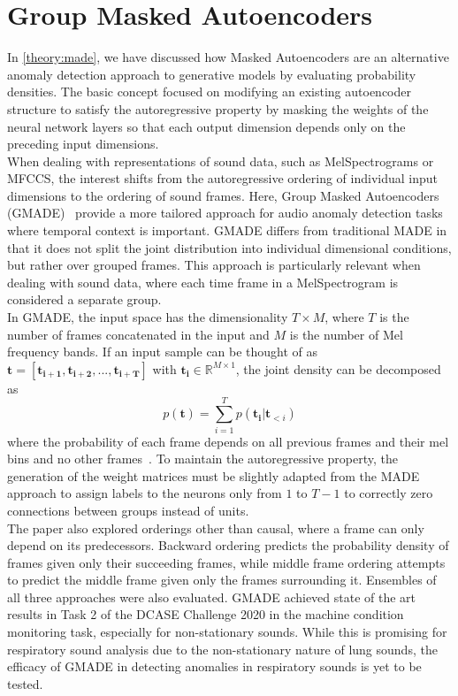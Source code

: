 \section{Group Masked Autoencoders}
In \autoref{theory:made}, we have discussed how Masked Autoencoders are an alternative anomaly detection approach to generative models by evaluating probability densities. The basic concept focused on modifying an existing autoencoder structure to satisfy the autoregressive property by masking the weights of the neural network layers so that each output dimension depends only on the preceding input dimensions.\\
When dealing with representations of sound data, such as MelSpectrograms or MFCCS, the interest shifts from the autoregressive ordering of individual input dimensions to the ordering of sound frames. Here, Group Masked Autoencoders (GMADE)~\cite{Giri2020} provide a more tailored approach for audio anomaly detection tasks where temporal context is important. GMADE differs from traditional MADE in that it does not split the joint distribution into individual dimensional conditions, but rather over grouped frames. This approach is particularly relevant when dealing with sound data, where each time frame in a MelSpectrogram is considered a separate group.\\
In GMADE, the input space has the dimensionality $T\times M$, where $T$ is the number of frames concatenated in the input and $M$ is the number of Mel frequency bands. If an input sample can be thought of as $\mathbf{t}=[\mathbf{t_{i+1}}, \mathbf{t_{i+2}},... ,\mathbf{t_{i+T}}]$ with $\mathbf{t_{i}}\in \mathbb{R}^{M\times 1}$, the joint density can be decomposed as \[ p(\mathbf{t})=\sum_{i=1}^{T}p(\mathbf{t_i}|\mathbf{t}_{<i}) \] where the probability of each frame depends on all previous frames and their mel bins and no other frames~\cite{Giri2020}. To maintain the autoregressive property, the generation of the weight matrices must be slightly adapted from the MADE approach to assign labels to the neurons only from $1$ to $T-1$ to correctly zero connections between groups instead of units.\\
The paper also explored orderings other than causal, where a frame can only depend on its predecessors. Backward ordering predicts the probability density of frames given only their succeeding frames, while middle frame ordering attempts to predict the middle frame given only the frames surrounding it. Ensembles of all three approaches were also evaluated. GMADE achieved state of the art results in Task 2 of the DCASE Challenge 2020 in the machine condition monitoring task, especially for non-stationary sounds. While this is promising for respiratory sound analysis due to the non-stationary nature of lung sounds, the efficacy of GMADE in detecting anomalies in respiratory sounds is yet to be tested.

